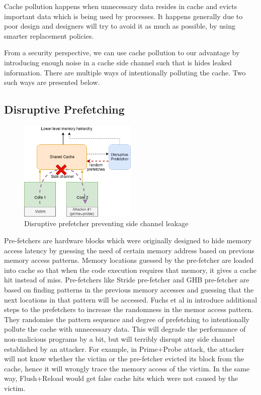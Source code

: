 Cache pollution happens when unnecessary data resides in cache and evicts
important data which is being used by processes.
It happens generally due to poor design and designers will
try to avoid it as much as possible, by using smarter replacement policies.

From a security perspective, we can use cache pollution to our advantage by
introducing enough noise in a cache side channel such that is hides leaked
information. There are multiple ways of intentionally polluting the cache. Two
such ways are presented below.

\subsection{Disruptive Prefetching} \label{sec:disruptive-section}

\begin{figure}[ht]
    \centering
    \includegraphics[width=0.5\textwidth]{figures/disruptive_prefetch}
    \caption{Disruptive prefetcher preventing side channel leakage}
    \label{fig:disruptive_prefetch}
\end{figure}

Pre-fetchers are hardware blocks which were originally designed to hide memory
access latency by guessing the need of certain memory address based on
previous memory access patterns. Memory locations guessed by the pre-fetcher
are loaded into cache so that when the code execution requires that memory, it
gives a cache hit instead of miss. Pre-fetchers like Stride pre-fetcher and
GHB pre-fetcher are based on finding patterns in the previous memory accesses
and guessing that the next locations in that pattern will be accessed. Fuchs
et al in  introduce additional steps to the prefetchers
to increase the randomness in the memor access pattern. They randomise the
pattern sequence and degree of prefetching to intentionally pollute the cache with
unnecessary data. This will degrade the performance of non-malicious programs
by a bit, but will terribly disrupt any side channel established by an
attacker. For example, in Prime+Probe attack, the attacker will not know
whether the victim or the pre-fetcher evicted its block from the cache, hence
it will wrongly trace the memory access of the victim. In the same way,
Flush+Reload would get false cache hits which were not caused by the victim.

